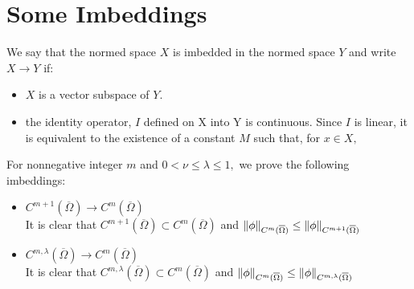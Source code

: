 \section{Some Imbeddings}
We say that the normed space $X$ is imbedded in the normed space $Y$ and write $X\rightarrow Y$ if:
\begin{itemize}
    \item $X$ is a vector subspace of $Y.$
    \item the identity operator, $I$ defined on X into Y is continuous. Since $I$ is linear, it is equivalent to the existence of a constant $M$ such that, for $x\in X,$
\end{itemize}
For nonnegative integer $m$ and $0<\nu\leq\lambda\leq 1,$ we prove the following imbeddings:
\begin{itemize}
    \item $C^{m+1}(\overline{\Omega})\rightarrow C^m(\overline{\Omega})$ \\
    It is clear that $C^{m+1}(\overline{\Omega})\subset C^m(\overline{\Omega})$ and $\norm{\phi}_{C^m(\overline{\Omega})}\leq\norm{\phi}_{C^{m+1}(\overline{\Omega})}$

    \item $C^{m,\lambda}(\overline{\Omega})\rightarrow C^m(\overline{\Omega})$ \\
    It is clear that $C^{m,\lambda}(\overline{\Omega})\subset C^m(\overline{\Omega})$ and $\norm{\phi}_{C^m(\overline{\Omega})}\leq\norm{\phi}_{C^{m,\lambda}(\overline{\Omega})}$


\end{itemize}
